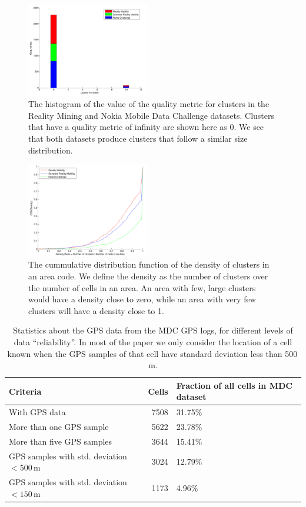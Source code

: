 \documentclass[letterpaper, 12pt, conference]{ieeeconf}
\begin{document}
\begin{figure}
\centering
\includegraphics[width=0.48\textwidth]{figs/cluster_quality}
\caption{The histogram of the value of the quality metric for clusters in the 
Reality Mining and Nokia Mobile Data Challenge datasets. Clusters that have a 
quality metric of infinity are shown here as 0. We see that both datasets 
produce clusters that follow a similar size distribution.}
\label{fig:cluster_quality}
\end{figure}

\begin{figure}
\centering
\includegraphics[width=0.48\textwidth]{figs/cluster_area_density}
\caption{The cummulative distribution function of the density of clusters in 
an area code. We define the density as the number of clusters over the number 
of cells in an area. An area with few, large clusters would have a density 
close to zero, while an area with very few clusters will have a density close 
to 1.}
\label{fig:cluster_area_density}
\end{figure}

\begin{table}
    \centering
    \begin{tabular}{ | m{2.8cm} || r | m{3cm} | }
    \hline
    Criteria & Cells & Fraction of all cells in MDC dataset \\
    \hline
		With GPS data & 7508 & 31.75\%  \\
    \hline
		More than one GPS sample & 5622 & 23.78\% \\
    \hline
		More than five  GPS samples & 3644 & 15.41\% \\
    \hline
		GPS samples with  std. deviation~$ < 500$\,m & 3024 & 12.79\% \\
    \hline
		GPS samples with  std. deviation~$ < 150$\,m & 1173 & 4.96\% \\
    \hline
    \end{tabular}
\caption{Statistics about the GPS data from the MDC GPS logs, for different 
levels of data ``reliability''. In most of the paper we only consider the 
location of a cell known when the GPS samples of that cell have standard 
deviation less than 500\,m. }
\label{tbl:gsm_logs_stats}
\end{table}
\end{document}
